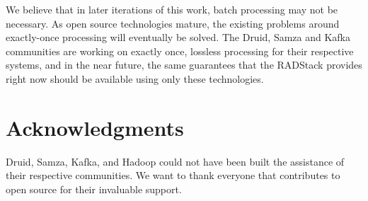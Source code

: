 \documentclass{vldb}
\begin{document}
We believe that in later iterations of this work, batch processing may not be
necessary. As open source technologies mature, the existing problems around
exactly-once processing will eventually be solved. The Druid, Samza and Kafka
communities are working on exactly once, lossless processing for their
respective systems, and in the near future, the same guarantees that the
RADStack provides right now should be available using only these technologies.


\balance

\section{Acknowledgments}
Druid, Samza, Kafka, and Hadoop could not have been built the assistance of
their respective communities. We want to thank everyone that contributes to
open source for their invaluable support.


\end{document}
